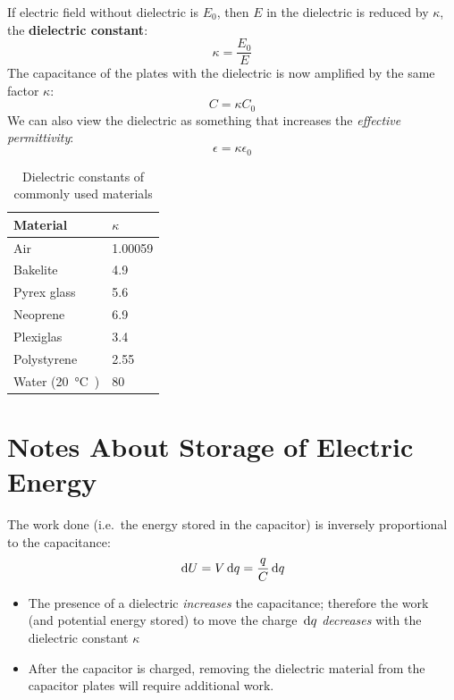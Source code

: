 If electric field without dielectric is $E_0$, then $E$ in the dielectric is
reduced by $\kappa$, the \textbf{dielectric constant}:
\begin{equation}
  \boxed{\kappa=\frac{E_0}E}
\end{equation}
The capacitance of the plates with the dielectric is now amplified by the
same factor $\kappa$:
\begin{equation}
  \boxed{C=\kappa C_0}
\end{equation}
We can also view the dielectric as something that increases the
\emph{effective permittivity}:
\begin{equation}
  \boxed{\epsilon=\kappa\epsilon_0}
\end{equation}


\begin{table}[ht]
  \centering
  \begin{tabular}{l|l}
    \rowcolor{pink}
    \textbf{Material} & $\kappa$ \\ \hline
    Air         & \num{1.00059} \\
    Bakelite    & \num{4.9} \\
    Pyrex glass & \num{5.6} \\
    Neoprene    & \num{6.9} \\
    Plexiglas   & \num{3.4} \\
    Polystyrene & \num{2.55} \\
    Water (\SI{20}\celsius) & \num{80} 
  \end{tabular}
  \caption{Dielectric constants of commonly used materials}
\end{table}



\section{Notes About Storage of Electric Energy}
The work done (i.e.\ the energy stored in the capacitor) is inversely
proportional to the capacitance:
\begin{equation}
  \dl U=V\dl q=\frac qC\dl q
\end{equation}
\begin{itemize}
\item The presence of a dielectric \emph{increases} the capacitance; therefore
  the work (and potential energy stored) to move the charge $\dl q$
  \emph{decreases} with the dielectric constant $\kappa$
\item After the capacitor is charged, removing the dielectric material from
  the capacitor plates will require additional work.
\end{itemize}



